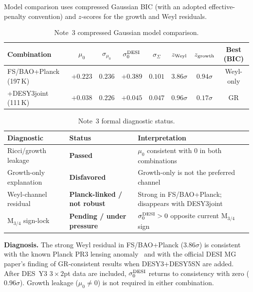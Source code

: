 \documentclass[11pt]{article}
\begin{document}
Model comparison uses compressed Gaussian BIC (with an adopted
effective-penalty convention) and $z$-scores for the growth and Weyl residuals.

\begin{table}[h]
\centering
\caption{Note~3 compressed Gaussian model comparison.}\label{tab:note3}
\small
\begin{tabular}{lccccccc}
\toprule
Combination & $\mu_0$ & $\sigma_{\mu_0}$ & $\sigma_0^{\rm DESI}$ & $\sigma_{\Sigma}$ & $z_{\rm Weyl}$ & $z_{\rm growth}$ & Best (BIC) \\
\midrule
FS/BAO+Planck (197\,K) & $+0.223$ & $0.236$ & $+0.389$ & $0.101$ & $3.86\sigma$ & $0.94\sigma$ & Weyl-only \\
+DESY3joint (111\,K) & $+0.038$ & $0.226$ & $+0.045$ & $0.047$ & $0.96\sigma$ & $0.17\sigma$ & GR \\
\bottomrule
\end{tabular}
\end{table}

\begin{table}[h]
\centering
\caption{Note~3 formal diagnostic status.}\label{tab:note3diag}
\begin{tabular}{lll}
\toprule
Diagnostic & Status & Interpretation \\
\midrule
Ricci/growth leakage & \textbf{Passed} & $\mu_0$ consistent with 0 in both combinations \\
Growth-only explanation & \textbf{Disfavored} & Growth-only is not the preferred channel \\
Weyl-channel residual & \textbf{Planck-linked / not robust} & Strong in FS/BAO+Planck; disappears with DESY3joint \\
M$_{3/4}$ sign-lock & \textbf{Pending / under pressure} & $\sigma_0^{\rm DESI}>0$ opposite current M$_{3/4}$ sign \\
\bottomrule
\end{tabular}
\end{table}

\vspace{0.3em}
\noindent\textbf{Diagnosis.}\;
The strong Weyl residual in FS/BAO+Planck ($3.86\sigma$) is consistent with the
known Planck PR3 lensing anomaly~\cite{Planck2018} and with the official DESI MG
paper's finding of GR-consistent results when DESY3+DESY5SN are added.  After DES~Y3
$3\times2$pt data are included, $\sigma_0^{\rm DESI}$ returns to consistency with zero
($0.96\sigma$).  Growth leakage ($\mu_0\neq0$) is not required in either combination.
\end{document}
